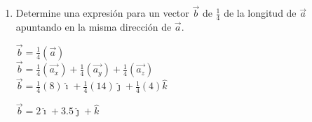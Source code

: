 \documentclass[10pt, a4paper]{article}
\begin{document}
\begin{enumerate}
\begin{enumerate}
            \begin{center}
            \end{center}

            \item Determine una expresión para un vector $\vec{b}$ de $\frac{1}{4}$ de la longitud de $\vec{a}$ 
            apuntando en la misma dirección de $\vec{a}$.

            \begin{center}
                $\vec{b}= \frac{1}{4}(\vec{a})$\\
                $\vec{b}= \frac{1}{4}(\vec{a_x})+\frac{1}{4}(\vec{a_y})+\frac{1}{4}(\vec{a_z})$\\
                $\vec{b}= \frac{1}{4}(8)\hat\imath+\frac{1}{4}(14)\hat\jmath+\frac{1}{4}(4)\hat{k}$

                $\vec{b}= 2\hat\imath+3.5\hat\jmath+\hat{k}$
            \end{center}
            

\end{enumerate}
\end{enumerate}
\end{document}
